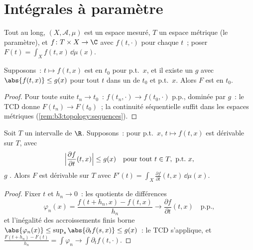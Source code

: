 \section{Intégrales à paramètre}

Tout au long, $(X, \mathcal A, \mu)$ est un espace mesuré,
$T$ un espace métrique (le paramètre), et $f \colon T \times
X \to \C$ avec $f(t, \cdot)$  pour chaque $t$~;
poser $F(t) = \int_X f(t, x)\,\dd\mu(x)$.

\begin{theorem}[Continuité]\label{thm:b3:lebesgue:paramcont}
Supposons~: $t \mapsto f(t,x)$ est  en $t_0$ pour
p.t.\ $x$, et il existe un $g$  avec $\abs{f(t,x)}
\leq g(x)$ pour tout $t$ dans un  de $t_0$ et p.t.\
$x$. Alors $F$ est  en $t_0$.\index{intégrales à
paramètre}
\end{theorem}

\begin{proof}
Pour toute suite $t_n \to t_0$~: $f(t_n, \cdot) \to f(t_0,
\cdot)$ p.p., dominée par $g$~: le TCD donne $F(t_n) \to
F(t_0)$~; la continuité séquentielle suffit dans les
espaces métriques (\cref{rem:b3:topology:sequences}).
\end{proof}

\begin{theorem}
\label{thm:b3:lebesgue:paramdiff}
Soit $T$ un intervalle  de $\R$. Supposons~: pour p.t.\
$x$, $t \mapsto f(t,x)$ est dérivable sur $T$, avec
\[
\Bigl|\frac{\partial f}{\partial t}(t, x)\Bigr| \leq g(x)
\quad \text{pour tout } t \in T,\ \text{p.t.\ } x,
\]
$g$ . Alors $F$ est dérivable sur $T$ avec $F'(t)
= \int_X \frac{\partial f}{\partial t}(t, x)\,\dd\mu(x)$.
\end{theorem}

\begin{proof}
Fixer $t$ et $h_n \to 0$~: les quotients de différences
\[
\varphi_n(x) = \frac{f(t + h_n, x) - f(t, x)}{h_n}
\longrightarrow \frac{\partial f}{\partial t}(t,x)
\quad\text{p.p.},
\]
et l'inégalité des accroissements finis borne
$\abs{\varphi_n(x)} \leq \sup_{s}\abs{\partial_tf(s,x)} \leq
g(x)$~: le TCD s'applique, et $\frac{F(t + h_n) -
F(t)}{h_n} = \int\varphi_n \to \int\partial_t f(t,
\cdot)$.
\end{proof}

